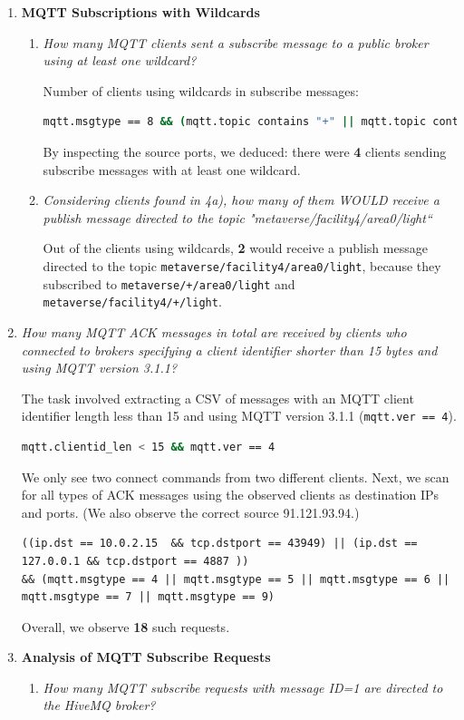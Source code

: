 \documentclass{article}
\begin{document}
\begin{enumerate}
    \item \textbf{MQTT Subscriptions with Wildcards}
    \begin{enumerate}
        \item \textit{How many MQTT clients sent a subscribe message to a public broker
using at least one wildcard?}
        
        Number of clients using wildcards in subscribe messages:
        \begin{lstlisting}[language=bash]
mqtt.msgtype == 8 && (mqtt.topic contains "+" || mqtt.topic contains "#") && ip.src != 127.0.0.1
        \end{lstlisting}
        By inspecting the source ports, we deduced: there were \textbf{4} clients sending subscribe messages with at least one wildcard.

        \item 
        \textit{Considering clients found in 4a), how many of them WOULD receive
a publish message directed to the topic "metaverse/facility4/area0/light“}

        Out of the clients using wildcards, \textbf{2} would receive a publish message  directed to the topic \texttt{metaverse/facility4/area0/light}, because they subscribed to \verb|metaverse/+/area0/light| and \verb|metaverse/facility4/+/light|.
    \end{enumerate}

    \item \textit{How many MQTT ACK messages in total are received by clients
who connected to brokers specifying a client identifier shorter than
15 bytes and using MQTT version 3.1.1?}

    The task involved extracting a CSV of messages with an MQTT client identifier length less than 15 and using MQTT version 3.1.1 (\texttt{mqtt.ver == 4}).
    \begin{lstlisting}[language=bash]
mqtt.clientid_len < 15 && mqtt.ver == 4
    \end{lstlisting}
    We only see two connect commands from two different clients. Next, we scan for all types of ACK messages using the observed clients as destination IPs and ports. (We also observe the correct source 91.121.93.94.)
    \begin{lstlisting}
((ip.dst == 10.0.2.15  && tcp.dstport == 43949) || (ip.dst == 127.0.0.1 && tcp.dstport == 4887 )) 
&& (mqtt.msgtype == 4 || mqtt.msgtype == 5 || mqtt.msgtype == 6 || mqtt.msgtype == 7 || mqtt.msgtype == 9)
    \end{lstlisting}
    Overall, we observe \textbf{18} such requests.
    \item \textbf{Analysis of MQTT Subscribe Requests}
    \begin{enumerate}
        \item \textit{How many MQTT subscribe requests with message ID=1 are directed
to the HiveMQ broker?}


\end{enumerate}
\end{enumerate}
\end{document}

